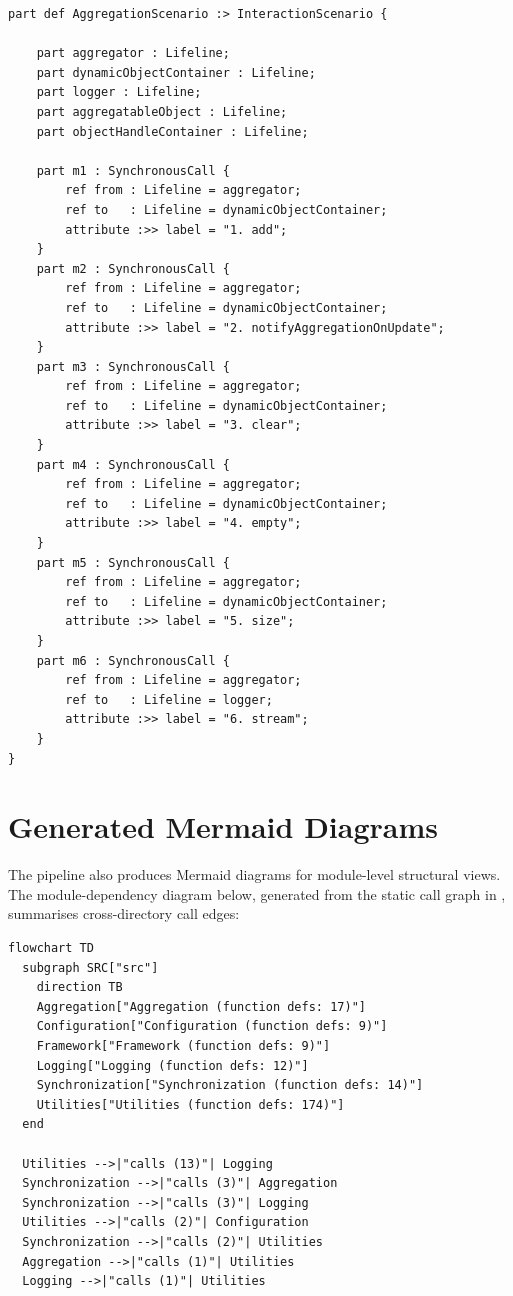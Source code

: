 \begin{verbatim}
part def AggregationScenario :> InteractionScenario {

    part aggregator : Lifeline;
    part dynamicObjectContainer : Lifeline;
    part logger : Lifeline;
    part aggregatableObject : Lifeline;
    part objectHandleContainer : Lifeline;

    part m1 : SynchronousCall {
        ref from : Lifeline = aggregator;
        ref to   : Lifeline = dynamicObjectContainer;
        attribute :>> label = "1. add";
    }
    part m2 : SynchronousCall {
        ref from : Lifeline = aggregator;
        ref to   : Lifeline = dynamicObjectContainer;
        attribute :>> label = "2. notifyAggregationOnUpdate";
    }
    part m3 : SynchronousCall {
        ref from : Lifeline = aggregator;
        ref to   : Lifeline = dynamicObjectContainer;
        attribute :>> label = "3. clear";
    }
    part m4 : SynchronousCall {
        ref from : Lifeline = aggregator;
        ref to   : Lifeline = dynamicObjectContainer;
        attribute :>> label = "4. empty";
    }
    part m5 : SynchronousCall {
        ref from : Lifeline = aggregator;
        ref to   : Lifeline = dynamicObjectContainer;
        attribute :>> label = "5. size";
    }
    part m6 : SynchronousCall {
        ref from : Lifeline = aggregator;
        ref to   : Lifeline = logger;
        attribute :>> label = "6. stream";
    }
}
\end{verbatim}

\section{Generated Mermaid Diagrams}
\label{sec:appendix-mermaid}

The pipeline also produces Mermaid diagrams for module-level structural
views. The module-dependency diagram below, generated from the static
call graph in \neo, summarises cross-directory call edges:

\begin{verbatim}
flowchart TD
  subgraph SRC["src"]
    direction TB
    Aggregation["Aggregation (function defs: 17)"]
    Configuration["Configuration (function defs: 9)"]
    Framework["Framework (function defs: 9)"]
    Logging["Logging (function defs: 12)"]
    Synchronization["Synchronization (function defs: 14)"]
    Utilities["Utilities (function defs: 174)"]
  end

  Utilities -->|"calls (13)"| Logging
  Synchronization -->|"calls (3)"| Aggregation
  Synchronization -->|"calls (3)"| Logging
  Utilities -->|"calls (2)"| Configuration
  Synchronization -->|"calls (2)"| Utilities
  Aggregation -->|"calls (1)"| Utilities
  Logging -->|"calls (1)"| Utilities
\end{verbatim}

